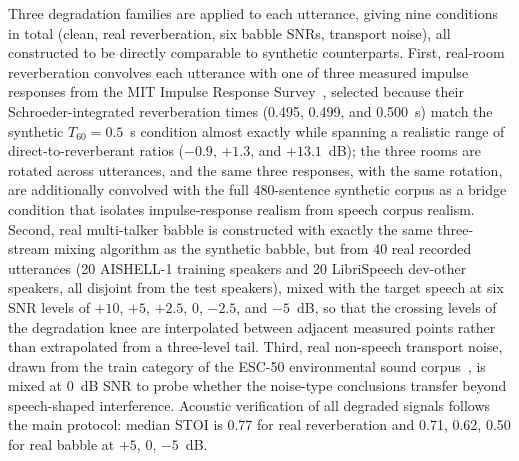 Three degradation families are applied to each utterance, giving nine
conditions in total (clean, real reverberation, six babble SNRs, transport
noise), all constructed to
be directly comparable to synthetic counterparts. First, real-room
reverberation convolves each utterance with one of three measured impulse
responses from the MIT Impulse Response Survey~\citep{traer2016statistics},
selected because their Schroeder-integrated reverberation times (0.495,
0.499, and 0.500~s) match the synthetic $T_{60} = 0.5$~s condition almost
exactly while spanning a realistic range of direct-to-reverberant ratios
($-0.9$, $+1.3$, and $+13.1$~dB); the three rooms are rotated across
utterances, and the same three responses, with the same rotation, are
additionally convolved with the full 480-sentence synthetic corpus as a
bridge condition that isolates impulse-response realism from speech
corpus realism. Second, real multi-talker babble is constructed with exactly
the same three-stream mixing algorithm as the synthetic babble, but from
40 real recorded utterances (20 AISHELL-1 training speakers and 20
LibriSpeech dev-other speakers, all disjoint from the test speakers),
mixed with the target speech at six SNR levels of $+10$, $+5$, $+2.5$, $0$,
$-2.5$, and $-5$~dB, so that the crossing levels of the degradation knee are
interpolated between adjacent measured points rather than extrapolated from
a three-level tail. Third, real non-speech transport noise, drawn from the
train category of the ESC-50 environmental sound corpus~\citep{piczak2015esc},
is mixed at 0~dB SNR to probe whether the noise-type conclusions transfer
beyond speech-shaped interference. Acoustic verification of all degraded
signals follows the main protocol: median STOI is 0.77 for real reverberation
and 0.71, 0.62, 0.50 for real babble at $+5$, $0$, $-5$~dB.

